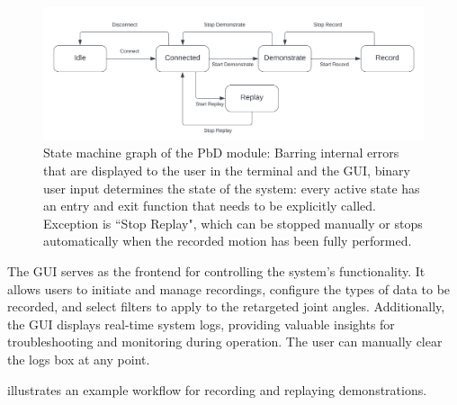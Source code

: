 \documentclass{CSSRforAfrica}
\begin{document}
\begin{figure}[H]
    \centering
    \includegraphics[width=\textwidth]{figures/StateMachineGraph.png}
    \captionsetup{width=\textwidth}
    \caption{State machine graph of the PbD module: Barring internal errors that are displayed to the user in the terminal and the GUI, binary user input determines the state of the system: every active state has an entry and exit function that needs to be explicitly called. Exception is ``Stop Replay", which can be stopped manually or stops automatically when the recorded motion has been fully performed. }
    \label{fig:statemachinegraph}
\end{figure}  
\newpage 
The GUI serves as the frontend for controlling the system’s functionality. It allows users to initiate and manage recordings, configure the types of data to be recorded, and select filters to apply to the retargeted joint angles. Additionally, the GUI displays real-time system logs, providing valuable insights for troubleshooting and monitoring during operation. The user can manually clear the logs box at any point. 

 illustrates an example workflow for recording and replaying demonstrations. 
\end{document}
